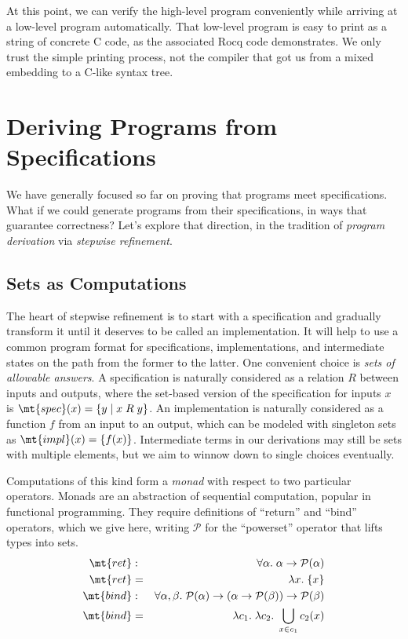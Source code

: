 \documentclass{amsbook}
\theoremstyle{definition}
\theoremstyle{remark}
\numberwithin{section}{chapter}
\numberwithin{equation}{chapter}
\begin{document}
At this point, we can verify the high-level program conveniently while arriving at a low-level program automatically.
That low-level program is easy to print as a string of concrete C code, as the associated Rocq code demonstrates.
We only trust the simple printing process, not the compiler that got us from a mixed embedding to a C-like syntax tree.



\chapter{Deriving Programs from Specifications}\label{deriving}

We have generally focused so far on proving that programs meet specifications.
What if we could generate programs from their specifications, in ways that guarantee correctness?
Let's explore that direction, in the tradition of \emph{program derivation} via \emph{stepwise refinement}.

\section{Sets as Computations}

The heart of stepwise refinement is to start with a specification and gradually transform it until it deserves to be called an implementation.
It will help to use a common program format for specifications, implementations, and intermediate states on the path from the former to the latter.
One convenient choice is \emph{sets of allowable answers}.
A specification is naturally considered as a relation $R$ between inputs and outputs, where the set-based version of the specification for inputs $x$ is $\mt{spec}(x) = \{y \mid x \; R \; y\}$.
An implementation is naturally considered as a function $f$ from an input to an output, which can be modeled with singleton sets as $\mt{impl}(x) = \{f(x)\}$.
Intermediate terms in our derivations may still be sets with multiple elements, but we aim to winnow down to single choices eventually.

Computations of this kind form a \emph{monad} with respect to two particular operators.
Monads are an abstraction of sequential computation, popular in functional programming.
They require definitions of ``return'' and ``bind'' operators, which we give here, writing $\mathcal P$ for the ``powerset'' operator that lifts types into sets.
\begin{eqnarray*}
  \mt{ret} &:& \forall \alpha. \; \alpha \to \mathcal P(\alpha) \\
  \mt{ret} &=& \lambda x. \; \{x\} \\
  \mt{bind} &:& \forall \alpha, \beta. \; \mathcal P(\alpha) \to (\alpha \to \mathcal P(\beta)) \to \mathcal P(\beta) \\
  \mt{bind} &=& \lambda c_1. \; \lambda c_2. \; \bigcup_{x \in c_1} c_2(x)
\end{eqnarray*}
\end{document}
